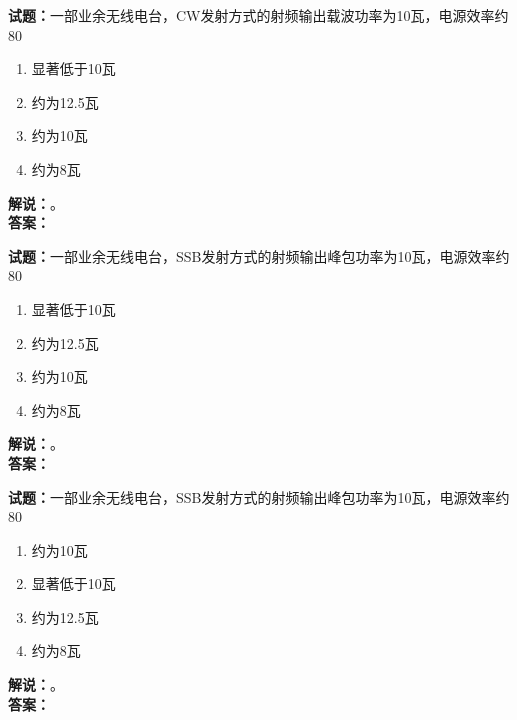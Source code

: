 \documentclass{ctexbook}
\begin{document}
\vspace{\baselineskip}

\noindent\textbf{试题：}一部业余无线电台，CW发射方式的射频输出载波功率为10瓦，电源效率约80%
\begin{enumerate}[leftmargin=3em]
  \item 显著低于10瓦
  \item 约为12.5瓦
  \item 约为10瓦
  \item 约为8瓦
\end{enumerate}
\noindent\textbf{解说：}\textbf{}。\\\noindent\textbf{答案：}

\vspace{\baselineskip}

\noindent\textbf{试题：}一部业余无线电台，SSB发射方式的射频输出峰包功率为10瓦，电源效率约80%
\begin{enumerate}[leftmargin=3em]
  \item 显著低于10瓦
  \item 约为12.5瓦
  \item 约为10瓦
  \item 约为8瓦
\end{enumerate}
\noindent\textbf{解说：}\textbf{}。\\\noindent\textbf{答案：}

\vspace{\baselineskip}


\noindent\textbf{试题：}一部业余无线电台，SSB发射方式的射频输出峰包功率为10瓦，电源效率约80%
\begin{enumerate}[leftmargin=3em]
  \item 约为10瓦
  \item 显著低于10瓦
  \item 约为12.5瓦
  \item 约为8瓦
\end{enumerate}
\noindent\textbf{解说：}\textbf{}。\\\noindent\textbf{答案：}
\end{document}
